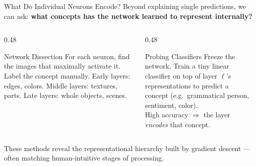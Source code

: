 \documentclass[aspectratio=169]{beamer}
\begin{document}
\begin{frame}{What Do Individual Neurons Encode?}
  Beyond explaining single predictions, we can ask:
  \textbf{what concepts has the network learned to represent internally?}

  \vspace{0.7em}
  \begin{columns}[T]
    \begin{column}{0.48\textwidth}
      \begin{block}{Network Dissection}
        For each neuron, find the images that maximally activate it.
        Label the concept manually.
        Early layers: edges, colors.
        Middle layers: textures, parts.
        Late layers: whole objects, scenes.
      \end{block}
    \end{column}
    \begin{column}{0.48\textwidth}
      \begin{block}{Probing Classifiers}
        Freeze the network. Train a tiny linear classifier on top
        of layer $\ell$'s representations to predict a concept
        (e.g.\ grammatical person, sentiment, color).\\
        High accuracy $\Rightarrow$ the layer \emph{encodes} that concept.
      \end{block}
    \end{column}
  \end{columns}

  \vspace{0.7em}
  These methods reveal the \alert{representational hierarchy} built by
  gradient descent — often matching human-intuitive stages of processing.
\end{frame}
\end{document}
